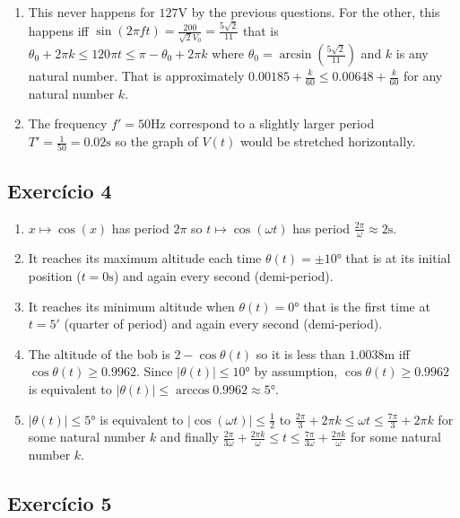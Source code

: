 \begin{enumerate}
\item This never happens for $127 \text{V}$ by the previous questions.
  For the other, this happens iff
  $\sin{(2 \pi f t)} = \frac{200}{\sqrt{2} V_0} = \frac{5 \sqrt{2}}{11}$
  that is
  ${\theta_0 + 2 \pi k} \leq {120 \pi t} \leq
  {\pi - \theta_0 + 2\pi k}$
  where
  $\theta_0 = \arcsin\left(\frac{5 \sqrt{2}}{11}\right)$
  and $k$ is any natural number.
  That is approximately
  $0.00185 + \frac{k}{60} \leq 0.00648 + \frac{k}{60}$
  for any natural number $k$.
\item The frequency $f' = 50\text{Hz}$ correspond to a slightly larger
  period $T'= \frac{1}{50} = 0.02\text{s}$ so the graph of $V(t)$ would
  be stretched horizontally.
\end{enumerate}

\subsection*{Exercício 4}

\begin{enumerate}
\item $x \mapsto \cos\left(x\right)$ has period $2\pi$ so
  $t \mapsto \cos\left(\omega t\right)$ has period $\frac{2\pi}{\omega}
  \approx 2\text{s}$.
\item It reaches its maximum altitude each time $\theta{(t)} = \pm 10°$ that is
  at its initial position ($t=0\text{s}$) and again every second (demi-period).
\item It reaches its minimum altitude when $\theta{(t)} = 0°$ that is the
  first time at $t=5'$ (quarter of period) and again every second (demi-period).
\item
  The altitude of the bob is $2 - \cos{\theta(t)}$ so it is less than
  $1.0038\text{m}$ iff
  $\cos{\theta(t)} \geq 0.9962$. Since ${|\theta(t)|} \leq 10°$ by assumption,
  $\cos{\theta(t)} \geq 0.9962$ is
  equivalent to ${|\theta(t)|} \leq \arccos 0.9962 \approx 5°$.
\item ${|\theta{(t)}|} \leq 5°$ is equivalent
  to $|\cos\left(\omega t\right)| \leq \frac{1}{2}$
  to ${\frac{2\pi}{3} + {2 \pi k}}
  \leq {\omega t}
  \leq {\frac{7\pi}{3} + {2 \pi k}}$ for some natural number $k$
  and finally
  ${\frac{2\pi}{3\omega} + \frac{2 \pi k}\omega}
  \leq t
  \leq {\frac{7\pi}{3\omega} + \frac{2 \pi k}\omega}$
  for some natural number $k$.
\end{enumerate}

\subsection*{Exercício 5}

